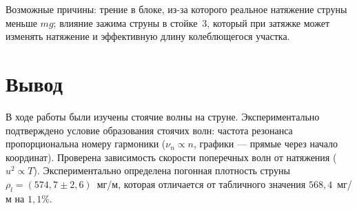 \documentclass[12pt,a4paper]{article}
\begin{document}
Возможные причины: трение в блоке, из-за которого реальное натяжение струны меньше $mg$; влияние зажима струны в стойке~3, который при затяжке может изменять натяжение и эффективную длину колеблющегося участка.

\section{Вывод}

В ходе работы были изучены стоячие волны на струне. Экспериментально подтверждено условие образования стоячих волн: частота резонанса пропорциональна номеру гармоники ($\nu_n\propto n$, графики --- прямые через начало координат). Проверена зависимость скорости поперечных волн от натяжения ($u^2\propto T$). Экспериментально определена погонная плотность струны $\rho_l=(574{,}7\pm2{,}6)$~мг/м, которая отличается от табличного значения $568{,}4$~мг/м на $1{,}1\%$.
\end{document}
